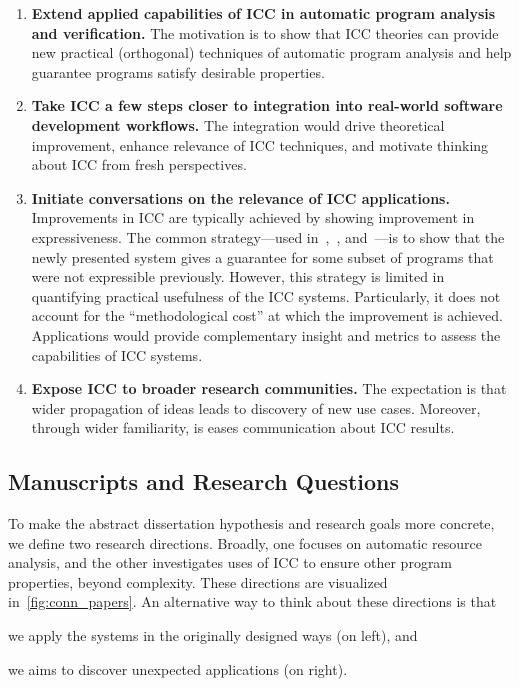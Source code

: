 \begin{enumerate}[label={\textbf{G\arabic*.}}]

\item\textbf{Extend applied capabilities of ICC in automatic program analysis
and verification.}
The motivation is to show that ICC theories can provide new practical
(orthogonal) techniques of automatic program analysis and help guarantee
programs satisfy desirable properties.

\item\textbf{Take ICC a few steps closer to integration into real-world software
development workflows.}
The integration would drive theoretical improvement, enhance relevance of ICC
techniques, and motivate thinking about ICC from fresh perspectives.

\item \textbf{Initiate conversations on the relevance of ICC applications.}
Improvements in ICC are typically achieved by showing improvement in
expressiveness. The common strategy---used \eg
in~\cite[p.16--17]{hainry2023},~\cite[p. 17]{jones2009}, and~\cite[p.
147]{feree2018}---is to show that the newly presented system gives a guarantee
for some subset of programs that were not expressible previously. However, this
strategy is limited in quantifying practical usefulness of the ICC systems.
Particularly, it does not account for the \enquote{methodological cost} at which
the improvement is achieved. Applications would provide complementary insight
and metrics to assess the capabilities of ICC systems.

\item \textbf{Expose ICC to broader research communities.}
The expectation is that wider propagation of ideas leads to discovery of new use
cases. Moreover, through wider familiarity, is eases communication about ICC
results.

\end{enumerate}

\subsection{Manuscripts and Research Questions}
\label{subsec:conn-papers}

To make the abstract dissertation hypothesis and research goals more concrete,
we define two research directions. Broadly, one focuses on automatic resource
analysis, and the other investigates uses of ICC to ensure other program
properties, beyond complexity. These directions are visualized
in~\autoref{fig:conn_papers}. An alternative way to think about these directions
is that
\begin{enumerate*}
\item we apply the systems in the originally designed ways (on left), and
\item we aims to discover unexpected applications (on right).
\end{enumerate*}

